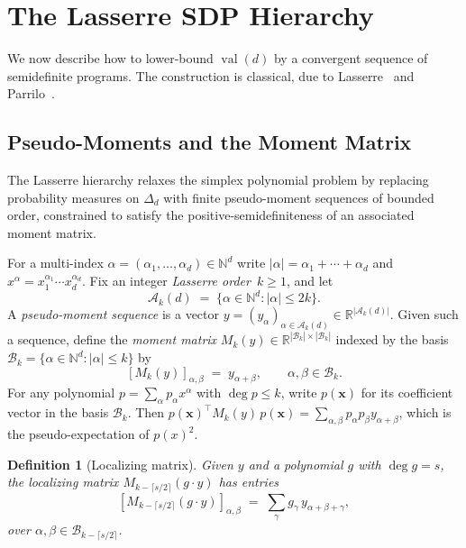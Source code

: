 \documentclass[11pt, letterpaper]{article}
\theoremstyle{paperplain}
\theoremstyle{paperdef}
\newtheorem{definition}[theorem]{Definition}
\newcommand{\R}{\mathbb{R}}
\newcommand{\N}{\mathbb{N}}
\newcommand{\val}{\operatorname{val}}
\begin{document}
\section{The Lasserre SDP Hierarchy}\label{sec:lasserre}

We now describe how to lower-bound $\val(d)$ by a convergent sequence
of semidefinite programs.  The construction is classical, due to
Lasserre~\cite{Lasserre2001,Lasserre2015} and Parrilo~\cite{Parrilo03}.

\subsection{Pseudo-Moments and the Moment Matrix}

The Lasserre hierarchy relaxes the simplex polynomial problem by
replacing probability measures on $\Delta_d$ with finite
pseudo-moment sequences of bounded order, constrained to satisfy the
positive-semidefiniteness of an associated moment matrix.

For a multi-index $\alpha=(\alpha_1,\ldots,\alpha_d)\in\N^d$ write
$|\alpha|=\alpha_1+\cdots+\alpha_d$ and $x^\alpha =
x_1^{\alpha_1}\cdots x_d^{\alpha_d}$.  Fix an integer
\emph{Lasserre order}~$k\ge 1$, and let
\[
  \mathcal{A}_k(d) \;=\; \{\alpha\in\N^d:|\alpha|\le 2k\}.
\]
A \emph{pseudo-moment sequence} is a vector
$y=(y_\alpha)_{\alpha\in\mathcal{A}_k(d)}\in\R^{|\mathcal{A}_k(d)|}$.
Given such a sequence, define the \emph{moment matrix}
$M_k(y)\in\R^{|\mathcal{B}_k|\times|\mathcal{B}_k|}$ indexed by the
basis $\mathcal{B}_k=\{\alpha\in\N^d:|\alpha|\le k\}$ by
\[
  [M_k(y)]_{\alpha,\beta} \;=\; y_{\alpha+\beta},
  \qquad \alpha,\beta\in\mathcal{B}_k.
\]
For any polynomial $p=\sum_\alpha p_\alpha x^\alpha$ with
$\deg p\le k$, write $p(\mathbf{x})$ for its coefficient vector in the
basis $\mathcal{B}_k$.  Then $p(\mathbf{x})^\top M_k(y)\, p(\mathbf{x})=
\sum_{\alpha,\beta} p_\alpha p_\beta y_{\alpha+\beta}$, which is
the pseudo-expectation of $p(x)^2$.

\begin{definition}[Localizing matrix]\label{def:localizing}
Given $y$ and a polynomial $g$ with $\deg g=s$, the
\emph{localizing matrix} $M_{k-\lceil s/2\rceil}(g\cdot y)$ has entries
\[
  [M_{k-\lceil s/2\rceil}(g\cdot y)]_{\alpha,\beta}
  \;=\;
  \sum_\gamma g_\gamma\, y_{\alpha+\beta+\gamma},
\]
over $\alpha,\beta\in\mathcal{B}_{k-\lceil s/2\rceil}$.
\end{definition}
\end{document}
